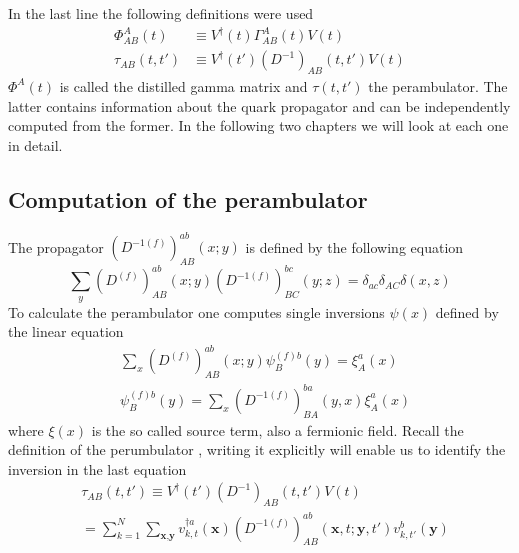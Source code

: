     In the last line the following definitions were used
    \begin{equation}
        \begin{aligned}\label{def_gamma_and_perambulator}
            \Phi_{AB}^A(t) &\equiv V^\dagger(t)\Gamma_{AB}^A(t)V(t)\\
            \tau_{AB}(t,t') &\equiv V^\dagger(t')(D^{-1})_{AB}(t,t')V(t)
        \end{aligned}
    \end{equation}
    $\Phi^A(t)$ is called the distilled gamma matrix and $\tau(t,t')$ the perambulator. The latter contains information about the quark propagator and can be independently computed from the former. In the following two chapters we will look at each one in detail.
    
\subsection{Computation of the perambulator}
    The propagator $(D^{-1(f)})^{ab}_{AB}(x;y)$ is defined by the following equation \cite{four_quark_correlation_functions}
    \begin{equation}
        \sum_{y}(D^{(f)})^{ab}_{AB}(x;y)(D^{-1(f)})^{bc}_{BC}(y;z) = \delta_{ac}\delta_{AC}\delta(x,z)
    \end{equation}
    To calculate the perambulator one computes single inversions $\psi(x)$ defined by the linear equation
    \begin{equation}
        \begin{aligned}\label{inversion_term}
            &\sum_{x}(D^{(f)})^{ab}_{AB}(x;y)\psi^{(f)b}_{B}(y) = \xi^a_A(x)\\
            &\psi^{(f)b}_{B}(y) = \sum_{x}(D^{-1(f)})^{ba}_{BA}(y,x)\xi^a_A(x)
        \end{aligned}
    \end{equation}
    where $\xi(x)$ is the so called source term, also a fermionic field. Recall the definition of the perumbulator , writing it explicitly will enable us to identify the inversion in the last equation \cite{bachelor_thesis_jan}
    \begin{equation}\label{perambulator_explicit}
        \begin{aligned}
            &\tau_{AB}(t,t') \equiv V^\dagger(t')(D^{-1})_{AB}(t,t')V(t)\\
            &= \sum_{k=1}^N \sum_{\textbf{x},\textbf{y}}
            v_{k,t}^{\dagger a}(\textbf{x}) 
            (D^{-1(f)})^{ab}_{AB}(\textbf{x},t;\textbf{y},t')
            v_{k,t'}^{b}(\textbf{y})\\
        \end{aligned}
    \end{equation}
